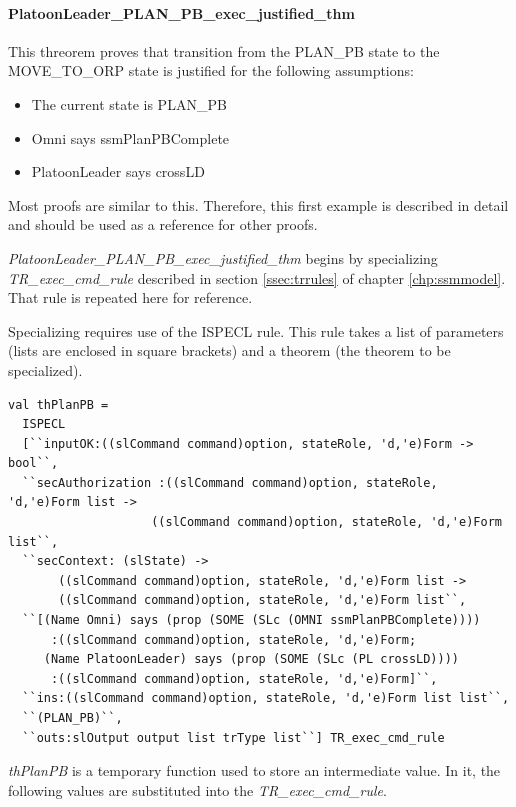 \documentclass[../../main/main.tex]{subfiles}
\begin{document}
\paragraph*{PlatoonLeader_PLAN_PB_exec_justified_thm}
This threorem proves that transition from the PLAN_PB state to the MOVE_TO_ORP state is justified for the following assumptions:
\begin{itemize}
\item The current state is PLAN_PB
\item Omni says ssmPlanPBComplete
\item PlatoonLeader says crossLD
\end{itemize}

Most proofs are similar to this.  Therefore, this first example is described in detail and should be used as a reference for other proofs.

\textit{PlatoonLeader_PLAN_PB_exec_justified_thm} begins by specializing \textit{TR_exec_cmd_rule} described in section \ref{ssec:trrules} of chapter \ref{chp:ssmmodel}.  That rule is repeated here for reference.

\HOLssmTheoremsTRXXexecXXcmdXXrule

Specializing requires use of the ISPECL rule.  This rule takes a list of parameters (lists are enclosed in square brackets) and a theorem (the theorem to be specialized).  

\begin{lstlisting}
val thPlanPB =
  ISPECL
  [``inputOK:((slCommand command)option, stateRole, 'd,'e)Form -> bool``,
  ``secAuthorization :((slCommand command)option, stateRole, 'd,'e)Form list ->
                    ((slCommand command)option, stateRole, 'd,'e)Form list``,
  ``secContext: (slState) ->
       ((slCommand command)option, stateRole, 'd,'e)Form list ->
       ((slCommand command)option, stateRole, 'd,'e)Form list``,
  ``[(Name Omni) says (prop (SOME (SLc (OMNI ssmPlanPBComplete))))
      :((slCommand command)option, stateRole, 'd,'e)Form;
     (Name PlatoonLeader) says (prop (SOME (SLc (PL crossLD))))
      :((slCommand command)option, stateRole, 'd,'e)Form]``,
  ``ins:((slCommand command)option, stateRole, 'd,'e)Form list list``,
  ``(PLAN_PB)``,
  ``outs:slOutput output list trType list``] TR_exec_cmd_rule
\end{lstlisting}

\textit{thPlanPB} is a temporary function used to store an intermediate value. In it, the following values are substituted into the \textit{TR_exec_cmd_rule}.  
\end{document}
